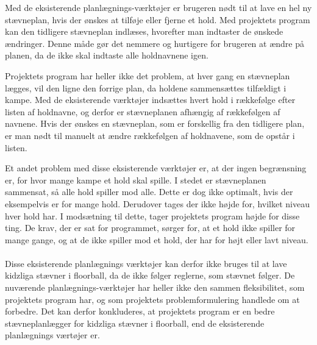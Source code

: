 Med de eksisterende planlægnings-værktøjer er brugeren nødt til at lave en hel ny stævneplan, hvis der ønskes at tilføje eller fjerne et hold. Med projektets program kan den tidligere stævneplan indlæses, hvorefter man indtaster de ønskede ændringer. Denne måde gør det nemmere og hurtigere for brugeren at ændre på planen, da de ikke skal indtaste alle holdnavnene igen.
\par
Projektets program har heller ikke det problem, at hver gang en stævneplan lægges, vil den ligne den forrige plan, da holdene sammensættes tilfældigt i kampe. Med de eksisterende værktøjer indsættes hvert hold i rækkefølge efter listen af holdnavne, og derfor er stævneplanen afhængig af rækkefølgen af navnene. Hvis der ønskes en stævneplan, som er forskellig fra den tidligere plan, er man nødt til manuelt at ændre rækkefølgen af holdnavene, som de opstår i listen.
\par
Et andet problem med disse eksisterende værktøjer er, at der ingen begrænsning er, for hvor mange kampe et hold skal spille. I stedet er stævneplanen sammensat, så alle hold spiller mod alle. Dette er dog ikke optimalt, hvis der eksempelvis er for mange hold. Derudover tages der ikke højde for, hvilket niveau hver hold har. I modsætning til dette, tager projektets program højde for disse ting. De krav, der er sat for programmet, sørger for, at et hold ikke spiller for mange gange, og at de ikke spiller mod et hold, der har for højt eller lavt niveau.
\\\\
Disse eksisterende planlægnings værktøjer kan derfor ikke bruges til at lave kidzliga stævner i floorball, da de ikke følger reglerne, som stævnet følger. De nuværende planlægnings-værktøjer har heller ikke den sammen fleksibilitet, som projektets program har, og som projektets problemformulering handlede om at forbedre. Det kan derfor konkluderes, at projektets program er en bedre stævneplanlægger for kidzliga stævner i floorball, end de eksisterende planlægnings værtøjer er.  

